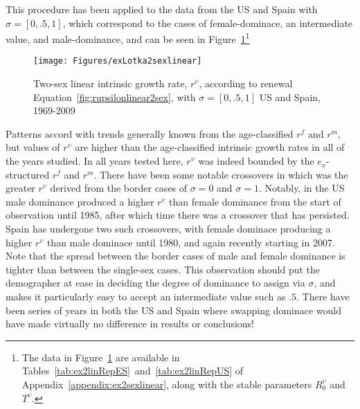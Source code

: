 This procedure has been applied to the data from the US and Spain with $\sigma
= [0,.5,1]$, which correspond to the cases of female-dominace, an
intermediate value, and male-dominance, and can be seen in
Figure~\ref{fig:rupsilonlinear2sex}\footnote{The data in
    Figure~\ref{fig:rupsilonlinear2sex} are available in
    Tables~\ref{tab:ex2linRepES}~and~\ref{tab:ex2linRepUS} of
    Appendix~\ref{appendix:ex2sexlinear}, along with the stable parameters
    $R_0^\upsilon$ and $T^\upsilon$.}

\begin{figure}[!ht]
  \centering
    \caption{Two-sex linear intrinsic growth rate, $r^\upsilon$, according to
    renewal Equation~\eqref{fig:rupsilonlinear2sex}, with $\sigma = [0, .5, 1]$ US 
    and Spain, 1969-2009}
     \texttt{[image: Figures/exLotka2sexlinear]}
     \label{fig:rupsilonlinear2sex}
\end{figure}

Patterns accord with trends generally known from the age-classified $r^f$ and
$r^m$, but values of $r^\upsilon$ are higher than the
age-classified intrinsic growth rates in all of the years studied. In all years
tested here, $r^\upsilon$ was indeed bounded by the $e_x$-structured $r^f$ and $r^m$. There have been some notable crossovers in
which was the greater $r^\upsilon$ derived from the border cases of $\sigma = 0$
and  $\sigma = 1$. Notably, in the US male dominance produced a higher
$r^\upsilon$ than female dominance from the start of observation until
1985, after which time there was a crossover that has persisted. Spain has
undergone two such crossovers, with female dominace producing a higher
$r^\upsilon$ than male dominace until 1980, and again recently starting in 2007.
Note that the spread between the border cases of male and female dominance is
tighter than between the single-sex cases. This observation should put the
demographer at ease in deciding the degree of dominance to assign via $\sigma$,
and makes it particularly easy to accept an intermediate value such as $.5$.
There have been series of years in both the US and Spain where swapping dominace
would have made virtually no difference in results or conclusions!
